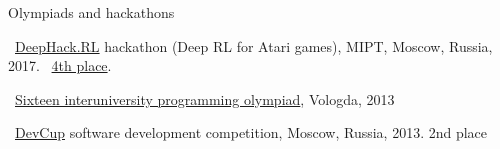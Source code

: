 \documentclass{resume} %
\begin{document}

\begin{rSection}{Olympiads and hackathons}
\item \faExternalLink~\href{http://web.archive.org/web/20170224094223/http://rl.deephack.me/}{DeepHack.RL} hackathon (Deep RL for Atari games), MIPT, Moscow, Russia, 2017. \faExternalLink~\href{https://github.com/sergeivolodin/deephack.rl}{4th place}.
\item \faExternalLink~\href{http://olympiads.vologda-uni.ru/interuni/}{Sixteen interuniversity programming olympiad}, Vologda, 2013
\item \faExternalLink~\href{https://vk.com/devcup}{DevCup} software development competition, Moscow, Russia, 2013. 2nd place
\end{rSection}


\newpage
\end{document}
